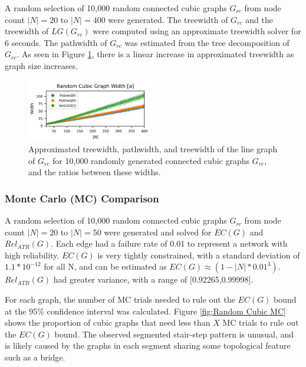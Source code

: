 \documentclass[12pt,twocolumn]{article}
\begin{document}
A random selection of 10,000 random connected cubic graphs \(G_{rc}\) from node count \(|N|=20\) to \(|N|=400\) were generated. The treewidth of \(G_{rc}\) and the treewidth of \(LG(G_{rc})\) were computed using an approximate treewidth solver \cite{dell2018pace} for 6 seconds. The pathwidth of \(G_{rc}\) was estimated from the tree decomposition of \(G_{rc}\). As seen in Figure \ref{fig:Random Cubic Treewidth}, there is a linear increase in approximated treewidth as graph size increases.

\begin{figure}[t]
\caption{Approximated treewidth, pathwidth, and treewidth of the line graph of $G_{rc}$ for 10,000 randomly generated connected cubic graphs $G_{rc}$, and the ratios between these widths.}
\label{fig:Random Cubic Treewidth}
\includegraphics[width=0.5\textwidth]{../figures/RcubicWidth_short.png}
\end{figure}

\hypertarget{monte-carlo-mc-comparison-1}{%
\subsubsection{Monte Carlo (MC) Comparison}\label{monte-carlo-mc-comparison-1}}

A random selection of 10,000 random connected cubic graphs \(G_{rc}\) from node count \(|N|=20\) to \(|N|=50\) were generated and solved for \(EC(G)\) and \(Rel_{ATR}(G)\). Each edge had a failure rate of 0.01 to represent a network with high reliability. \(EC(G)\) is very tightly constrained, with a standard deviation of \(1.1*10^{-12}\) for all \textbar N\textbar, and can be estimated as \(EC(G) \approx (1-|N|*0.01^3)\). \(Rel_{ATR}(G)\) had greater variance, with a range of {[}0.92265,0.99998{]}.

For each graph, the number of MC trials needed to rule out the \(EC(G)\) bound at the 95\% confidence interval was calculated. Figure \ref{fig:Random Cubic MC} shows the proportion of cubic graphs that need less than \(X\) MC trials to rule out the \(EC(G)\) bound. The observed segmented stair-step pattern is unusual, and is likely caused by the graphs in each segment sharing some topological feature such as a bridge.
\end{document}
